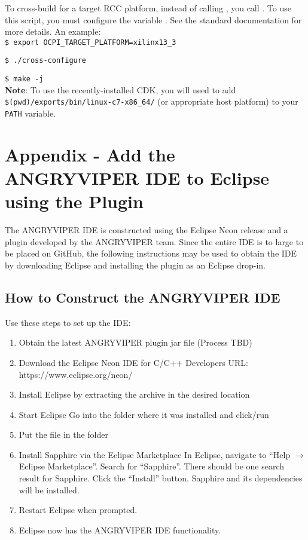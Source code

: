 \begin{appendices}
To cross-build for a target RCC platform, instead of calling , you call . To use this script, you must configure the variable . See the standard documentation for more details. An example:\\

\verb+$ export OCPI_TARGET_PLATFORM=xilinx13_3+

\verb+$ ./cross-configure+

\verb+$ make -j+\\

\textbf{Note}: To use the recently-installed CDK, you will need to add \verb+$(pwd)/exports/bin/linux-c7-x86_64/+ (or appropriate host platform) to your \verb+PATH+ variable.

\newpage
\section{Appendix - Add the ANGRYVIPER IDE to Eclipse using the Plugin}

\label{IDE:create_by_dropin}
The ANGRYVIPER IDE is constructed using the Eclipse Neon release and a plugin developed by the ANGRYVIPER team. Since the entire IDE is to large to be placed on GitHub, the following instructions may be used to obtain the IDE by downloading Eclipse and installing the plugin as an Eclipse drop-in. \\

\subsection{How to Construct the ANGRYVIPER IDE}
\label{subsec:construct_ide}
Use these steps to set up the IDE:

\begin{enumerate}
\item Obtain the latest ANGRYVIPER plugin jar file
\subitem (Process TBD)
\item Download the Eclipse Neon IDE for C/C++ Developers
\subitem URL: https://www.eclipse.org/neon/ 
\item Install Eclipse by extracting the archive in the desired location
\item Start Eclipse
\subitem Go into the folder where it was installed and click/run 
\item Put the  file in the  folder
\item Install Sapphire via the Eclipse Marketplace
\subitem In Eclipse, navigate to ``Help $\rightarrow$ Eclipse Marketplace''. Search for ``Sapphire''. There should be one search result for Sapphire.
Click the ``Install'' button.  Sapphire and its dependencies will be installed.
\item Restart Eclipse when prompted.
\item Eclipse now has the ANGRYVIPER IDE functionality.
\end{enumerate}


\end{appendices}
